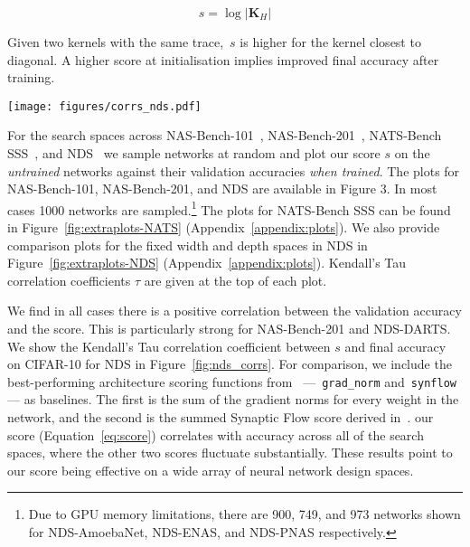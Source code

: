 \documentclass{article}
\newcommand{\matr}[1]{\mathbf{#1}}
\begin{document}
\begin{equation}
s = \log \vert \matr{K}_H \vert
\label{eq:score}
\end{equation}

Given two kernels with the same trace,~$s$ is higher for the kernel closest to diagonal. A higher score at initialisation implies improved final accuracy after training.


\begin{figure*}[!h]

\texttt{[image: figures/corrs\_nds.pdf]}
\caption{Kendall's Tau correlation across each of the NDS CIFAR-10 search spaces. We compare our method to two alternative measures: \texttt{grad\_norm} and \texttt{synflow}. The results for \texttt{grad\_norm} refer to the absolute Euclidean-norm of the gradients over one random mini-batch of data. \texttt{synflow} is the gradient-based score defined by~\cite{tanaka2020pruning}, summed over each parameter in the network.}
\label{fig:nds_corrs}
\end{figure*}

For the search spaces across NAS-Bench-101~\citep{ying2019bench}, NAS-Bench-201~\citep{Dong2020NAS-Bench-201}, NATS-Bench SSS~\citep{dong2021nats}, and NDS~\citep{radosavovic2019network} we sample networks at random and plot our score $s$ on the {\it untrained} networks against their validation accuracies {\it when trained}. The plots for NAS-Bench-101, NAS-Bench-201, and NDS are available in Figure 3. In most cases 1000 networks are sampled.\footnote{Due to GPU memory limitations, there are 900, 749, and 973 networks shown for NDS-AmoebaNet, NDS-ENAS, and NDS-PNAS respectively.}
The plots for NATS-Bench SSS can be found in Figure~\ref{fig:extraplots-NATS} (Appendix~\ref{appendix:plots}). We also provide comparison plots for the fixed width and depth spaces in NDS in Figure~\ref{fig:extraplots-NDS} (Appendix~\ref{appendix:plots}). Kendall's Tau correlation coefficients $\tau$ are given at the top of each plot.

We find in all cases there is a positive correlation between the validation accuracy and the score. This is particularly strong for NAS-Bench-201 and NDS-DARTS. We show the Kendall's Tau correlation coefficient between $s$ and final accuracy on CIFAR-10 for NDS in Figure~\ref{fig:nds_corrs}. For comparison, we include the best-performing architecture scoring functions from~\cite{abdelfattah2021zerocost} ---~\texttt{grad\_norm} and~\texttt{synflow} --- as baselines. The first is the sum of the gradient norms for every weight in the network, and the second is the summed Synaptic Flow score derived in~\cite{tanaka2020pruning}. our score (Equation~\ref{eq:score}) correlates with accuracy across all of the search spaces, where the other two scores fluctuate substantially. These results point to our score being effective on a wide array of neural network design spaces.
\end{document}
